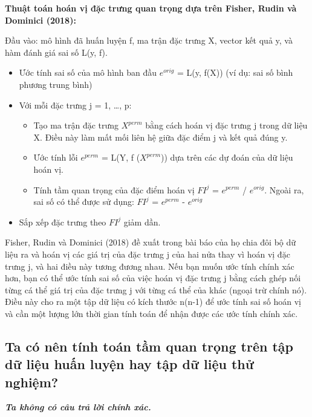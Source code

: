 \textbf{Thuật toán hoán vị đặc trưng quan trọng dựa trên Fisher, Rudin và Dominici (2018):}

Đầu vào: mô hình đã huấn luyện f, ma trận đặc trưng X, vector kết quả y, và hàm đánh giá sai số L(y, f).

\begin{itemize}
    \item Ước tính sai số của mô hình ban đầu $e^{orig}$ = L(y, f(X)) (ví dụ: sai số bình phương trung bình)
    \item Với mỗi đặc trưng j = 1, …, p:
    \begin{itemize}
        \item Tạo ma trận đặc trưng $X^{perm}$ bằng cách hoán vị đặc trưng j trong dữ liệu X. Điều này làm mất mối liên hệ giữa đặc điểm j và kết quả đúng y.
        \item Ước tính lỗi $e^{perm}$ = L(Y, f ($X^{perm}$)) dựa trên các dự đoán của dữ liệu hoán vị.
        \item Tính tầm quan trọng của đặc điểm hoán vị $FI^{j}$ = $e^{perm}$ / $e^{orig}$. Ngoài ra, sai số  có thể được sử dụng: $FI^{j}$ = $e^{perm}$ - $e^{orig}$
    \end{itemize}
\item Sắp xếp đặc trưng theo $FI^{j}$ giảm dần. 
\end{itemize}
Fisher, Rudin và Dominici (2018) đề xuất trong bài báo của họ chia đôi bộ dữ liệu ra và hoán vị các giá trị của đặc trưng j của hai nửa thay vì hoán vị đặc trưng j, và hai điều này tương đương nhau. Nếu bạn muốn ước tính chính xác hơn, bạn có thể ước tính sai số của việc hoán vị đặc trưng j bằng cách ghép nối từng cá thể giá trị của đặc trưng j với từng cá thể của khác (ngoại trừ chính nó). Điều này cho ra một tập dữ liệu có kích thước n(n-1) để ước tính sai số hoán vị và cần một lượng lớn thời gian tính toán để nhận được các ước tính chính xác.

\subsection{Ta có nên tính toán tầm quan trọng trên tập dữ liệu huấn luyện hay tập dữ liệu thử nghiệm?}

\textbf{\textit{Ta không có câu trả lời chính xác.}}


